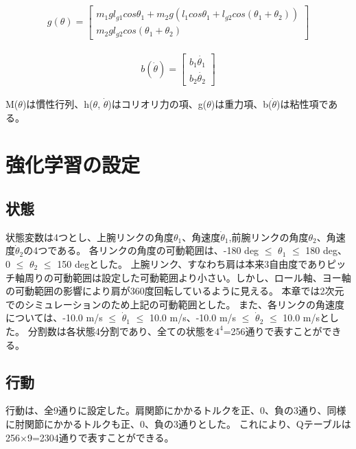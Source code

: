 \begin{eqnarray}
  g(\theta)=
            \begin{bmatrix}
              m_{1}gl_{g1}cos\theta_{1} + m_{2}g(l_{1}cos\theta_{1} + l_{g2}cos(\theta_{1} + \theta_{2})) \\
              m_{2}gl_{g2}cos(\theta_{1} + \theta_{2})
            \end{bmatrix}
\end{eqnarray}

\begin{eqnarray}
  b(\dot{\theta})=
            \begin{bmatrix}
              b_{1}\dot{\theta_{1}} \\
              b_{2}\dot{\theta_{2}}
            \end{bmatrix}
\end{eqnarray}

M($\theta$)は慣性行列、h($\theta$, $\dot{\theta}$)はコリオリ力の項、g($\theta$)は重力項、b($\dot{\theta}$)は粘性項である。

\section{強化学習の設定}
\subsection{状態}
状態変数は4つとし、上腕リンクの角度$\theta_{1}$、角速度$\dot{\theta}_{1}$,前腕リンクの角度$\theta_{2}$、角速度$\dot{\theta}_{2}$の4つである。
各リンクの角度の可動範囲は、-180 deg $\le$ $\theta_{1}$ $\le$ 180 deg、0 $\le$ $\theta_{2}$ $\le$ 150 degとした。
上腕リンク、すなわち肩は本来3自由度でありピッチ軸周りの可動範囲は設定した可動範囲より小さい。しかし、ロール軸、ヨー軸の可動範囲の影響により肩が360度回転しているように見える。
本章では2次元でのシミュレーションのため上記の可動範囲とした。
また、各リンクの角速度については、-10.0 m/s $\le$ $\dot{\theta}_{1}$ $\le$ 10.0 m/s、-10.0 m/s $\le$ $\dot{\theta}_{2}$ $\le$ 10.0 m/sとした。
分割数は各状態4分割であり、全ての状態を$4^{4}$=256通りで表すことができる。
\subsection{行動}
行動は、全9通りに設定した。肩関節にかかるトルクを正、0、負の3通り、同様に肘関節にかかるトルクも正、0、負の3通りとした。
これにより、Qテーブルは256$\times$9=2304通りで表すことができる。
